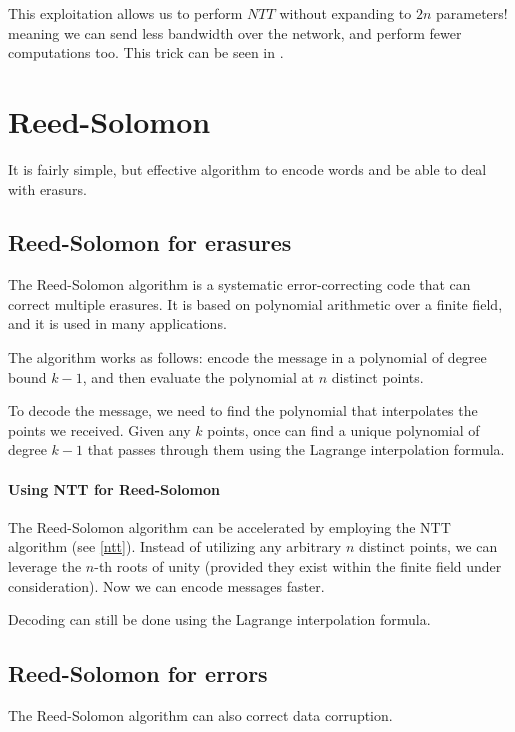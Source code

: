 This exploitation allows us to perform $NTT$ without expanding to $2n$ parameters!
meaning we can send less bandwidth over the network, and perform fewer computations too. 
This trick can be seen in \cite{SEAL}.

\section{Reed-Solomon}
It is fairly simple, but effective algorithm to encode words and be able to deal with erasurs.
\subsection{Reed-Solomon for erasures}
The Reed-Solomon algorithm is a systematic error-correcting code that can correct multiple erasures.
It is based on polynomial arithmetic over a finite field, and it is used in many applications.

The algorithm works as follows:
encode the message in a polynomial of degree bound $k-1$,
and then evaluate the polynomial at $n$ distinct points.

To decode the message, we need to find the polynomial that interpolates the points we received.
Given any $k$ points, once can find a unique polynomial of degree $k-1$ that passes through them
using the Lagrange interpolation formula.


\paragraph{Using NTT for Reed-Solomon} 
The Reed-Solomon algorithm can be accelerated by employing the NTT algorithm (see \autoref{ntt}).
Instead of utilizing any arbitrary $n$ distinct points, we can leverage the $n$-th 
roots of unity (provided they exist within the finite field under consideration).
Now we can encode messages faster.

Decoding can still be done using the Lagrange interpolation formula.


\subsection{Reed-Solomon for errors}
The Reed-Solomon algorithm can also correct data corruption.






